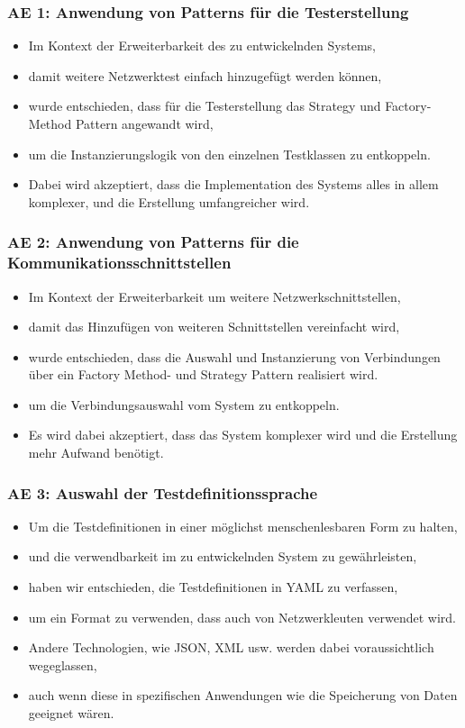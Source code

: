 \documentclass[
	ngerman,
	toc=listof, %
	toc=bibliography, %
	footnotes=multiple, %
	parskip=half, %
	numbers=noendperiod %
]{scrartcl}
\begin{document}
		\subsubsection{AE 1: Anwendung von Patterns für die Testerstellung}
		\begin{itemize}
			\item Im Kontext der Erweiterbarkeit des zu entwickelnden Systems,
			\item damit weitere Netzwerktest einfach hinzugefügt werden können,
			\item wurde entschieden, dass für die Testerstellung das Strategy und Factory-Method Pattern angewandt wird,
			\item um die Instanzierungslogik von den einzelnen Testklassen zu entkoppeln.
			\item Dabei wird akzeptiert, dass die Implementation des Systems alles in allem komplexer, und die Erstellung umfangreicher wird.			
		\end{itemize}

		\subsubsection{AE 2: Anwendung von Patterns für die Kommunikationsschnittstellen}
		\begin{itemize}
			\item Im Kontext der Erweiterbarkeit um weitere Netzwerkschnittstellen,
			\item damit das Hinzufügen von weiteren Schnittstellen vereinfacht wird,
			\item wurde entschieden, dass die Auswahl und Instanzierung von Verbindungen über ein Factory Method- und Strategy Pattern realisiert wird.
			\item um die Verbindungsauswahl vom System zu entkoppeln.
			\item Es wird dabei akzeptiert, dass das System komplexer wird und die Erstellung mehr Aufwand benötigt.
		\end{itemize}

		\subsubsection{AE 3: Auswahl der Testdefinitionssprache}
		\begin{itemize}
			\item Um die Testdefinitionen in einer möglichst menschenlesbaren Form zu halten,
			\item und die verwendbarkeit im zu entwickelnden System zu gewährleisten,
			\item haben wir entschieden, die Testdefinitionen in YAML zu verfassen,
			\item um ein Format zu verwenden, dass auch von Netzwerkleuten verwendet wird.
			\item Andere Technologien, wie JSON, XML usw. werden dabei voraussichtlich wegeglassen,
			\item auch wenn diese in spezifischen Anwendungen wie die Speicherung von Daten geeignet wären.
		\end{itemize}
		\newpage
\end{document}
